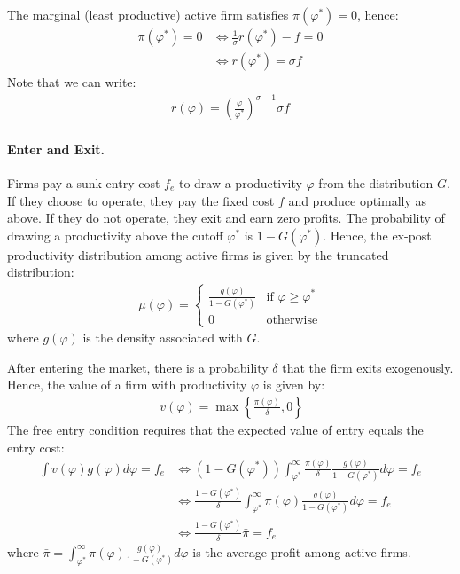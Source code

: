 \begin{solution}
    The marginal (least productive) active firm satisfies $\pi(\varphi^*)=0$, hence:
    \begin{align*}
        \pi(\varphi^*) = 0 &\iff \frac{1}{\sigma} r(\varphi^*) - f = 0 \\
        &\iff r(\varphi^*) = \sigma f 
    \end{align*}
    Note that we can write:
    \begin{align*}
        r(\varphi) = \left(\frac{\varphi}{\varphi^*}\right)^{\sigma - 1} \sigma f
    \end{align*}

    \paragraph{Enter and Exit.} Firms pay a sunk entry cost $f_e$ to draw a productivity $\varphi$ from the distribution $G$. If they choose to operate, they pay the fixed cost $f$ and produce optimally as above. If they do not operate, they exit and earn zero profits. The probability of drawing a productivity above the cutoff $\varphi^*$ is $1 - G(\varphi^*)$. Hence, the ex-post productivity distribution among active firms is given by the truncated distribution:
    \begin{align*}
        \mu(\varphi) = \begin{cases}
            \frac{g(\varphi)}{1 - G(\varphi^*)} & \text{if } \varphi \geq \varphi^*\\
            0 & \text{otherwise}
        \end{cases}
    \end{align*}
    where $g(\varphi)$ is the density associated with $G$.

    After entering the market, there is a probability $\delta$ that the firm exits exogenously. Hence, the value of a firm with productivity $\varphi$ is given by:
    \begin{align*}\
        v(\varphi) = \max\left\{\frac{\pi(\varphi)}{\delta}, 0\right\}
    \end{align*}
    The free entry condition requires that the expected value of entry equals the entry cost:
    \begin{align*}
        \int v(\varphi) g(\varphi) d\varphi = f_e &\iff (1-G(\varphi^*))\int_{\varphi^*}^{\infty} \frac{\pi(\varphi)}{\delta} \frac{g(\varphi)}{1 - G(\varphi^*)} d\varphi = f_e \\
        &\iff \frac{1-G(\varphi^*)}{\delta} \int_{\varphi^*}^{\infty} \pi(\varphi) \frac{g(\varphi)}{1 - G(\varphi^*)} d\varphi = f_e \\
        &\iff \frac{1-G(\varphi^*)}{\delta} \bar{\pi} = f_e
    \end{align*}
    where $\bar{\pi} = \int_{\varphi^*}^{\infty} \pi(\varphi) \frac{g(\varphi)}{1 - G(\varphi^*)} d\varphi$ is the average profit among active firms.


\end{solution}
